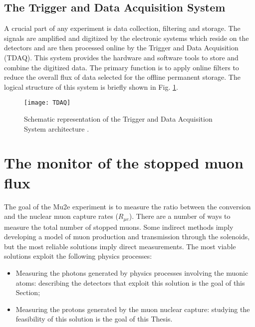\documentclass[12pt,a4paper,openright, oneside, titlepage]{book} %
\begin{document}
\subsection{The Trigger and Data Acquisition System}
A crucial part of any experiment is data collection, filtering and storage. 
The signals are amplified and digitized by the electronic systems which reside 
on the detectors and are then processed online by the Trigger and Data Acquisition (TDAQ)\cite{TDAQ}. 
This system provides the hardware and software tools to store and combine the digitized data. 
The primary function is to apply online filters to reduce the overall flux of data 
selected for the offline permanent storage. 
The logical structure of this system is briefly shown in Fig. \ref{_TDAQ}.

\begin{figure}[h!]
\centering
\texttt{[image: TDAQ]}
\caption{Schematic representation of the Trigger and Data Acquisition System architecture \cite{TDAQ}.}
\label{_TDAQ}
\end{figure}


\section{The monitor of the stopped muon flux}
The goal of the Mu2e experiment is to measure the ratio between the conversion and the nuclear muon capture rates
($R_{\mu e}$). 
There are a number of ways to measure the total number of stopped muons. 
Some indirect methods imply developing a model
of muon production and transmission through the solenoids, 
but the most reliable solutions imply direct measurements.
The most viable solutions exploit the following physics processes:
\begin{itemize}
\item Measuring the photons generated by physics processes involving the muonic atoms:
describing the detectors that exploit this solution is the goal of this Section;  
\item Measuring the protons generated by the muon nuclear capture: studying the feasibility of this solution is the goal of this Thesis.
\end{itemize} 
\end{document}
